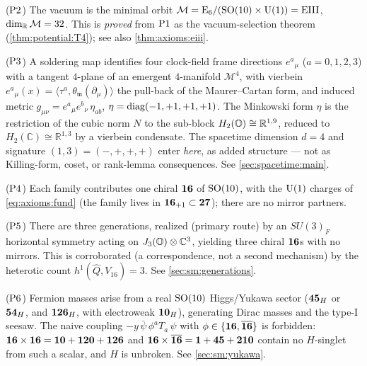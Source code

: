 \begin{postulate}\label{post:axioms:P2}
($\textnormal{P2}$) The vacuum is the minimal orbit
$\mathcal{M}=\mathrm{E}_{6}/(\mathrm{SO}(10)\times\mathrm{U}(1))=\mathrm{EIII}$, $\dim_{\mathbb R}\mathcal{M}=32$. This is
\emph{proved} from $\textnormal{P1}$ as the vacuum-selection theorem
(\autoref{thm:potential:T4}); see also \autoref{thm:axioms:eiii}.
\end{postulate}

\begin{postulate}\label{post:axioms:P3}
($\textnormal{P3}$) A soldering map identifies four clock-field frame directions
$e^{a}{}_{\mu}$ ($a=0,1,2,3$) with a tangent $4$-plane of an emergent
$4$-manifold $\mathcal M^4$, with vierbein
$e^{a}{}_{\mu}(x)=\langle\tau^a,\theta_{\mathfrak m}(\partial_\mu)\rangle$
the pull-back of the Maurer--Cartan form, and induced metric
$g_{\mu\nu}=e^{a}{}_{\mu}e^{b}{}_{\nu}\,\eta_{ab}$,
$\eta=\operatorname{diag}(-1,+1,+1,+1)$. The Minkowski form $\eta$ is the restriction of
the cubic norm $N$ to the sub-block $H_2(\mathbb{O})\cong\mathbb R^{1,9}$, reduced
to $H_2(\mathbb C)\cong\mathbb R^{1,3}$ by a vierbein condensate. The
spacetime dimension $d=4$ and signature $(1,3)=(-,+,+,+)$ enter \emph{here},
as added structure --- not as Killing-form, coset, or rank-lemma
consequences. See \autoref{sec:spacetime:main}.
\end{postulate}

\begin{postulate}\label{post:axioms:P4}
($\textnormal{P4}$) Each family contributes one chiral $\mathbf{16}$ of $\mathrm{SO}(10)$, with
the $\mathrm{U}(1)$ charges of \eqref{eq:axioms:fund} (the family lives in
$\mathbf{16}_{+1}\subset\mathbf{27}$); there are no mirror partners.
\end{postulate}

\begin{postulate}\label{post:axioms:P5}
($\textnormal{P5}$) There are three generations, realized (primary route) by an
$SU(3)_F$ horizontal symmetry acting on $J_3(\mathbb{O})\otimes\mathbb C^3$,
yielding three chiral $\mathbf{16}$s with no mirrors. This is corroborated
(a correspondence, not a second mechanism) by the heterotic count
$h^1(\widehat Q,V_{16})=3$. See \autoref{sec:sm:generations}.
\end{postulate}

\begin{postulate}\label{post:axioms:P6}
($\textnormal{P6}$) Fermion masses arise from a real $\mathrm{SO}(10)$ Higgs/Yukawa sector
($\mathbf{45}_H$ or $\mathbf{54}_H$, and $\mathbf{126}_H$, with electroweak
$\mathbf{10}_H$), generating Dirac masses and the type-I seesaw. The naive
coupling $-y\,\bar\psi\,\phi^a T_a\,\psi$ with $\phi\in\{\mathbf{16},\overline{\mathbf{16}}\}$
is forbidden: $\mathbf{16}\times\mathbf{16}=\mathbf{10}+\mathbf{120}+\mathbf{126}$ and
$\mathbf{16}\times\overline{\mathbf{16}}=\mathbf{1}+\mathbf{45}+\mathbf{210}$ contain no $H$-singlet
from such a scalar, and $H$ is unbroken. See \autoref{sec:sm:yukawa}.
\end{postulate}

